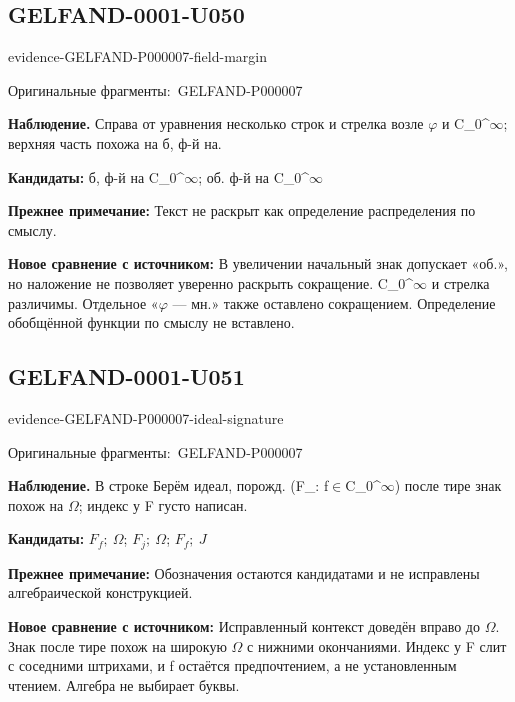 \documentclass[11pt]{article}
\newcommand{\EvidenceBlock}[4]{%
 \par\smallskip\noindent\begin{minipage}{\linewidth}
 \begin{minipage}[t]{.47\linewidth}\vspace{0pt}\centering
 \csname evidence-#1-#2\endcsname\par
 {\scriptsize\SourceCropCaption\ #1}\par
 \end{minipage}\hfill
 \begin{minipage}[t]{.49\linewidth}\vspace{0pt}\raggedright
 {\small\color{orange!65!black}\textbf{#4} #3}\par
 \end{minipage}
 \end{minipage}\par\smallskip}
\newcommand{\SourceCropCaption}{Оригинальные фрагменты:}\newcommand{\ReadingCaption}{Сомнительное чтение.}\newcommand{\IncompleteCaption}{Неразобранный фрагмент.}\newcommand{\DiagramCaption}{Рисунок и набранное описание.}
\begin{document}
\subsection*{GELFAND-0001-U050}
\EvidenceBlock{GELFAND-P000007}{field-margin}{Справа от уравнения несколько строк и стрелка возле \(\varphi\) и C\_0\textasciicircum{}\(\infty\); верхняя часть похожа на б, ф-й на.}{Наблюдение.}
\par\smallskip\noindent\textbf{Кандидаты: } б, ф-й на C\_0\textasciicircum{}\(\infty\); об. ф-й на C\_0\textasciicircum{}\(\infty\)\par
\par\smallskip\noindent\textbf{Прежнее примечание: } Текст не раскрыт как определение распределения по смыслу.\par
\par\smallskip\noindent\textbf{Новое сравнение с источником: } В увеличении начальный знак допускает «об.», но наложение не позволяет уверенно раскрыть сокращение. C\_0\textasciicircum{}\(\infty\) и стрелка различимы. Отдельное «\(\varphi\) — мн.» также оставлено сокращением. Определение обобщённой функции по смыслу не вставлено.\par

\subsection*{GELFAND-0001-U051}
\EvidenceBlock{GELFAND-P000007}{ideal-signature}{В строке Берём идеал, порожд. (F\_: f\(\in\)C\_0\textasciicircum{}\(\infty\)) после тире знак похож на \(\Omega\); индекс у F густо написан.}{Наблюдение.}
\par\smallskip\noindent\textbf{Кандидаты: } \(F_f;\ \Omega\); \(F_j;\ \Omega\); \(F_f;\ J\)\par
\par\smallskip\noindent\textbf{Прежнее примечание: } Обозначения остаются кандидатами и не исправлены алгебраической конструкцией.\par
\par\smallskip\noindent\textbf{Новое сравнение с источником: } Исправленный контекст доведён вправо до \(\Omega\). Знак после тире похож на широкую \(\Omega\) с нижними окончаниями. Индекс у F слит с соседними штрихами, и f остаётся предпочтением, а не установленным чтением. Алгебра не выбирает буквы.\par
\end{document}

